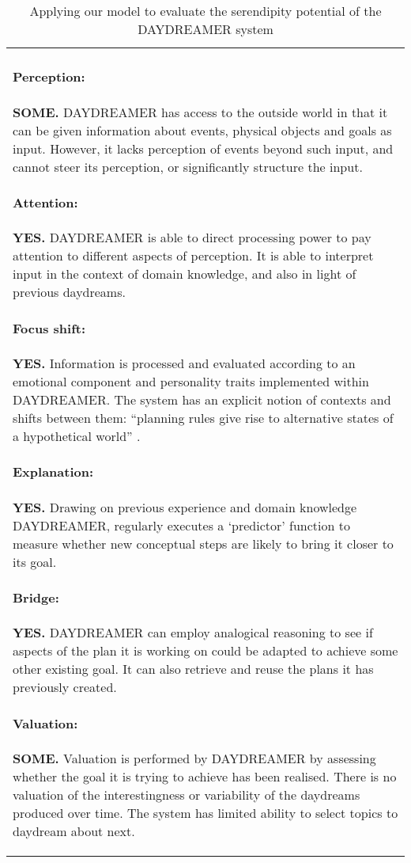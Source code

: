 \begin{table}
\begin{mdframed}[innertopmargin=-10pt]
\begin{tabular}{p{}}
\paragraph{Perception:}
\textbf{SOME.} {\sf DAYDREAMER} has access to the outside world in that it
can be given information about events, physical objects and goals as
input. However, it lacks perception of events beyond such input,
and cannot steer its perception, or significantly structure the input.
\paragraph{Attention:}
\textbf{YES.} {\sf DAYDREAMER} is able to direct processing
power to pay attention to different aspects of perception.  It is able
to interpret input in the context of domain knowledge, and also in
light of previous daydreams.
\paragraph{Focus shift:}
\textbf{YES.} Information is processed and evaluated according to an
emotional component and personality traits implemented within
{\sf DAYDREAMER}. The system has an explicit notion of contexts and shifts between them:
``planning rules give rise to alternative states of a hypothetical world''
\cite[p.~35]{mueller1990}.
\paragraph{Explanation:}
\textbf{YES.}  Drawing on previous experience and domain knowledge
       {\sf DAYDREAMER}, regularly executes a `predictor' function to
       measure whether new conceptual steps are likely to bring it
       closer to its goal.
\paragraph{Bridge:}
\textbf{YES.}  {\sf DAYDREAMER} can employ analogical reasoning to see
if aspects of the plan it is working on could be adapted to achieve
some other existing goal.  It can also retrieve and reuse the plans
it has previously created.
\paragraph{Valuation:}
\textbf{SOME.} Valuation is performed by {\sf DAYDREAMER} by assessing whether
the goal it is trying to achieve has been realised.  There is no valuation of the interestingness
or variability of the daydreams produced over time. 
The system has limited ability to select topics to daydream about next.
\end{tabular}
\end{mdframed}
\vspace{-.2cm}
\caption{Applying our model to evaluate the serendipity potential of the {\sf DAYDREAMER} system\label{ex:daydreamer}}
\end{table}


